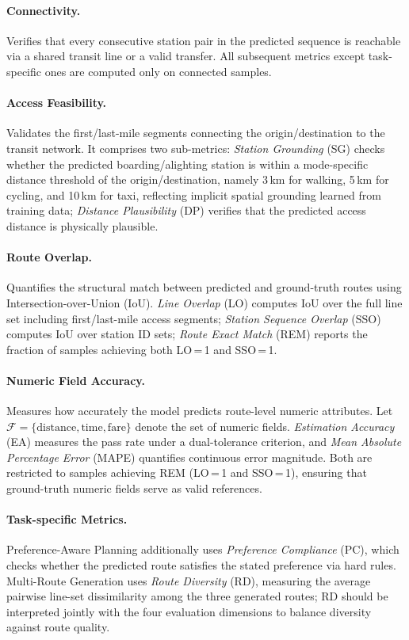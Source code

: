 \documentclass{article}
\begin{document}
\paragraph{Connectivity.} Verifies that every consecutive station pair in the predicted sequence is reachable via a shared transit line or a valid transfer. All subsequent metrics except task-specific ones are computed only on connected samples.
\paragraph{Access Feasibility.} Validates the first/last-mile segments connecting the origin/destination to the transit network. It comprises two sub-metrics: \textit{Station Grounding} (SG) checks whether the predicted boarding/alighting station is within a mode-specific distance threshold of the origin/destination, namely 3\,km for walking, 5\,km for cycling, and 10\,km for taxi, reflecting implicit spatial grounding \cite{li2023geolm} learned from training data; \textit{Distance Plausibility} (DP) verifies that the predicted access distance is physically plausible.
\paragraph{Route Overlap.} Quantifies the structural match between predicted and ground-truth routes using Intersection-over-Union (IoU). \textit{Line Overlap} (LO) computes IoU over the full line set including first/last-mile access segments; \textit{Station Sequence Overlap} (SSO) computes IoU over station ID sets; \textit{Route Exact Match} (REM) reports the fraction of samples achieving both LO\,=\,1 and SSO\,=\,1.
\paragraph{Numeric Field Accuracy.} Measures how accurately the model predicts route-level numeric attributes. Let $\mathcal{F} = \{\text{distance}, \text{time}, \text{fare}\}$ denote the set of numeric fields. \textit{Estimation Accuracy} (EA) measures the pass rate under a dual-tolerance criterion, and \textit{Mean Absolute Percentage Error} (MAPE) quantifies continuous error magnitude. Both are restricted to samples achieving REM (LO\,=\,1 and SSO\,=\,1), ensuring that ground-truth numeric fields serve as valid references.
\paragraph{Task-specific Metrics.} Preference-Aware Planning additionally uses \textit{Preference Compliance} (PC), which checks whether the predicted route satisfies the stated preference via hard rules. Multi-Route Generation uses \textit{Route Diversity} (RD), measuring the average pairwise line-set dissimilarity among the three generated routes; RD should be interpreted jointly with the four evaluation dimensions to balance diversity against route quality.
\endgroup
\end{document}
